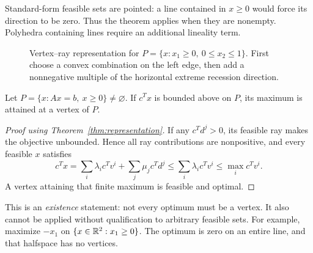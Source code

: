 \documentclass[11pt,a4paper]{article}
\begin{document}
Standard-form feasible sets are pointed: a line contained in $x\geq0$ would
force its direction to be zero. Thus the theorem applies when they are nonempty.
Polyhedra containing lines require an additional lineality term.

\begin{figure}[H]
  \centering
  \caption{Vertex--ray representation for $P=\{x:x_1\geq0,\ 0\leq x_2\leq1\}$.
    First choose a convex combination on the left edge, then add a nonnegative
    multiple of the horizontal extreme recession direction.}
  \label{fig:vertex-ray-representation}
\end{figure}

\begin{theorem}\label{thm:vertex}
  Let $P=\{x:Ax=b,\ x\geq0\}\neq\varnothing$. If $c^Tx$ is bounded above on $P$,
  its maximum is attained at a vertex of $P$.
\end{theorem}
\begin{proof}[Proof using Theorem~\ref{thm:representation}]
  If any $c^Td^j>0$, its feasible ray makes the objective unbounded. Hence all ray
  contributions are nonpositive, and every feasible $x$ satisfies
  \[
    c^Tx=\sum_i\lambda_i c^Tv^i+\sum_j\mu_j c^Td^j
    \leq\sum_i\lambda_i c^Tv^i\leq\max_i c^Tv^i.
  \]
  A vertex attaining that finite maximum is feasible and optimal.
\end{proof}
This is an \emph{existence} statement: not every optimum must be a vertex.
It also cannot be applied without qualification to arbitrary feasible sets.
For example, maximize $-x_1$ on $\{x\in\mathbb{R}^2:x_1\geq0\}$.
The optimum is zero on an entire line, and that halfspace has no vertices.
\end{document}
